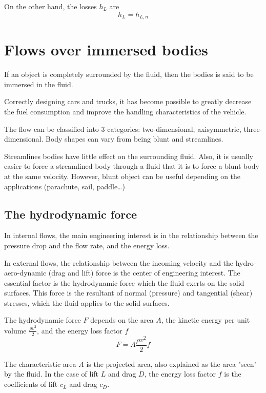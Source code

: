 \documentclass[10pt, twocolumn]{article}
\begin{document}
On the other hand, the losses \(h_L\) are
\[
  h_L = h_{L,n}
\]




\section{Flows over immersed bodies}
If an object is completely surrounded by the fluid, then the bodies is said to be immersed in the fluid.

Correctly designing cars and trucks, it has become possible to greatly decrease the fuel consumption and improve the handling characteristics of the vehicle.

The flow can be classified into 3 categories: two-dimensional, axisymmetric, three-dimensional.
Body shapes can vary from being blunt and streamlines.

Streamlines bodies have little effect on the surrounding fluid.
Also, it is usually easier to force a streamlined body through a fluid that it is to force a blunt body at the same velocity.
However, blunt object can be useful depending on the applications (parachute, sail, paddle\dots{})


\subsection{The hydrodynamic force}
In internal flows, the main engineering interest is in the relationship between the pressure drop and the flow rate, and the energy loss.

In external flows, the relationship between the incoming velocity and the hydro-aero-dynamic (drag and lift) force is the center of engineering interest.
The essential factor is the hydrodynamic force which the fluid exerts on the solid surfaces.
This force is the resultant of normal (pressure) and tangential (shear) stresses, which the fluid applies to the solid surfaces.

The hydrodynamic force \(F\) depends on the area \(A\), the kinetic energy per unit volume \(\frac{\rho v^2}{2}\), and the energy loss factor \(f\)
\[
  F = A \frac{\rho v^2}{2} f
\]

The characteristic area \(A\) is the projected area, also explained as the area "seen" by the fluid.
In the case of lift \(L\) and drag \(D\), the energy loss factor \(f\) is the coefficients of lift \(c_L\) and drag \(c_D\).
\end{document}
